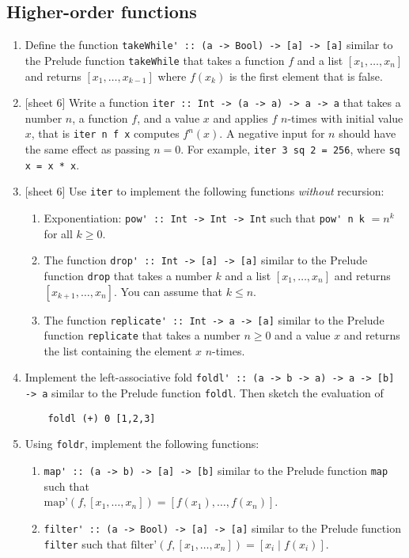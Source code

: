 \documentclass{article}
\begin{document}
\subsection{Higher-order functions}
\begin{enumerate}
\item Define the function \verb|takeWhile' :: (a -> Bool) -> [a] -> [a]| similar to the Prelude function \verb|takeWhile| that takes a function $f$ and a list $[x_1, \dots, x_n]$ and returns $[x_1, \dots, x_{k-1}]$ where $f(x_k)$ is the first element that is false.

\item {[sheet 6]} Write a function \verb|iter :: Int -> (a -> a) -> a -> a| that takes a number $n$, a function $f$, and a value $x$ and applies $f$ $n$-times with initial value $x$, that is \verb|iter n f x| computes $f^n(x)$. A negative input for $n$ should have the same effect as passing $n = 0$. For example, \verb|iter 3 sq 2 = 256|, where \verb|sq x = x * x|.

\item {[sheet 6]} Use \verb|iter| to implement the following functions \textit{without} recursion:
\begin{enumerate}
\item Exponentiation: \verb|pow' :: Int -> Int -> Int| such that \verb|pow' n k| $= n^k$ for all $k \geq 0$.
\item The function \verb|drop' :: Int -> [a] -> [a]| similar to the Prelude function \verb|drop| that takes a number $k$ and a list $[x_1, \dots, x_n]$ and returns $[x_{k+1}, \dots, x_n]$. You can assume that $k \leq n$.
\item The function \verb|replicate' :: Int -> a -> [a]| similar to the Prelude function \verb|replicate| that takes a number $n \geq 0$ and a value $x$ and returns the list containing the element $x$ $n$-times.
\end{enumerate}

\item Implement the left-associative fold \verb|foldl' :: (a -> b -> a) -> a -> [b] -> a| similar to the Prelude function \verb|foldl|. Then sketch the evaluation of
\begin{verbatim}
    foldl (+) 0 [1,2,3]
\end{verbatim}

\item Using \verb|foldr|, implement the following functions:
\begin{enumerate}
\item \verb|map' :: (a -> b) -> [a] -> [b]| similar to the Prelude function \verb|map| such that \\ $\text{map'}(f, [x_1, \dots, x_n]) = [f(x_1), \dots, f(x_n)]$.
\item \verb|filter' :: (a -> Bool) -> [a] -> [a]| similar to the Prelude function \verb|filter| such that $\text{filter'}(f, [x_1, \dots, x_n]) = [x_i \mid f(x_i)]$.
\end{enumerate}


\end{enumerate}
\end{document}
